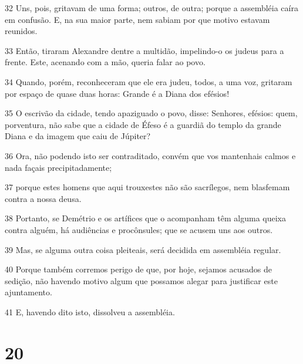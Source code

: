 \par 32 Uns, pois, gritavam de uma forma; outros, de outra; porque a assembléia caíra em confusão. E, na sua maior parte, nem sabiam por que motivo estavam reunidos.
\par 33 Então, tiraram Alexandre dentre a multidão, impelindo-o os judeus para a frente. Este, acenando com a mão, queria falar ao povo.
\par 34 Quando, porém, reconheceram que ele era judeu, todos, a uma voz, gritaram por espaço de quase duas horas: Grande é a Diana dos efésios!
\par 35 O escrivão da cidade, tendo apaziguado o povo, disse: Senhores, efésios: quem, porventura, não sabe que a cidade de Éfeso é a guardiã do templo da grande Diana e da imagem que caiu de Júpiter?
\par 36 Ora, não podendo isto ser contraditado, convém que vos mantenhais calmos e nada façais precipitadamente;
\par 37 porque estes homens que aqui trouxestes não são sacrílegos, nem blasfemam contra a nossa deusa.
\par 38 Portanto, se Demétrio e os artífices que o acompanham têm alguma queixa contra alguém, há audiências e procônsules; que se acusem uns aos outros.
\par 39 Mas, se alguma outra coisa pleiteais, será decidida em assembléia regular.
\par 40 Porque também corremos perigo de que, por hoje, sejamos acusados de sedição, não havendo motivo algum que possamos alegar para justificar este ajuntamento.
\par 41 E, havendo dito isto, dissolveu a assembléia.

\chapter{20}

